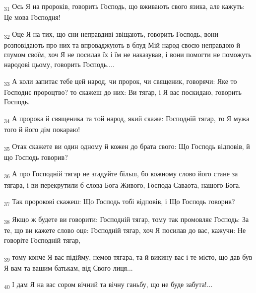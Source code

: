 \begin{tcolorbox}
\textsubscript{31} Ось Я на пророків, говорить Господь, що вживають свого язика, але кажуть: Це мова Господня!
\end{tcolorbox}
\begin{tcolorbox}
\textsubscript{32} Оце Я на тих, що сни неправдиві звіщають, говорить Господь, вони розповідають про них та впроваджують в блуд Мій народ своєю неправдою й глумом своїм, хоч Я не посилав їх і їм не наказував, і вони помогти не поможуть народові цьому, говорить Господь....
\end{tcolorbox}
\begin{tcolorbox}
\textsubscript{33} А коли запитає тебе цей народ, чи пророк, чи священик, говорячи: Яке то Господнє пророцтво? то скажеш до них: Ви тягар, і Я вас поскидаю, говорить Господь.
\end{tcolorbox}
\begin{tcolorbox}
\textsubscript{34} А пророка й священика та той народ, який скаже: Господній тягар, то Я мужа того й його дім покараю!
\end{tcolorbox}
\begin{tcolorbox}
\textsubscript{35} Отак скажете ви один одному й кожен до брата свого: Що Господь відповів, й що Господь говорив?
\end{tcolorbox}
\begin{tcolorbox}
\textsubscript{36} А про Господній тягар не згадуйте більш, бо кожному слово його стане за тягара, і ви перекрутили б слова Бога Живого, Господа Саваота, нашого Бога.
\end{tcolorbox}
\begin{tcolorbox}
\textsubscript{37} Так пророкові скажеш: Що Господь тобі відповів, і Що Господь говорив?
\end{tcolorbox}
\begin{tcolorbox}
\textsubscript{38} Якщо ж будете ви говорити: Господній тягар, тому так промовляє Господь: За те, що ви кажете слово оце: Господній тягар, хоч Я посилав до вас, кажучи: Не говоріте Господній тягар,
\end{tcolorbox}
\begin{tcolorbox}
\textsubscript{39} тому конче Я вас підійму, немов тягара, та й викину вас і те місто, що дав був Я вам та вашим батькам, від Свого лиця...
\end{tcolorbox}
\begin{tcolorbox}
\textsubscript{40} І дам Я на вас сором вічний та вічну ганьбу, що не буде забута!...
\end{tcolorbox}
